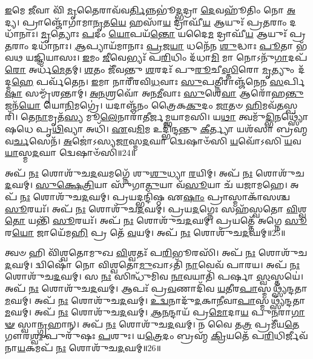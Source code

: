 \-\ul{𑌇}\-𑌮𑍇 \ul{𑌜𑍀}\-𑌵𑌾 𑌵𑌿᳴ \ul{𑌮𑍃}\-𑌤𑍈𑌰𑌾𑌵᳴𑌵\-\ul{𑌰𑍍𑌤𑌿}\-𑌨𑍍𑌨𑌭𑍂॑\-\ul{𑌦𑍍𑌭}\-𑌦𑍍𑌰𑌾 \ul{𑌦𑍇}\-𑌵𑌹𑍂᳴𑌤𑌿𑌂 𑌨𑍋 \ul{𑌅}\-𑌦𑍍𑌯। 
𑌪𑍍𑌰𑌾𑌞𑍍𑌜𑍋᳴𑌗𑌾𑌮𑌾\-\ul{𑌨𑍃}\-𑌤\-\ul{𑌯𑍇} 𑌹𑌸𑌾᳴\-\ul{𑌯} 𑌦𑍍𑌰𑌾𑌘𑍀᳴\-\ul{𑌯} 𑌆𑌯𑍁𑌃᳴ 𑌪𑍍𑌰\-\ul{𑌤}\-𑌰𑌾𑌂 𑌦𑌧𑌾᳴𑌨𑌾𑌃। 
\-\ul{𑌮𑍃}\-𑌤𑍍𑌯𑍋𑌃 \ul{𑌪}\-𑌦𑌂 \ul{𑌯𑍋}\-𑌪𑌯᳴\-\ul{𑌨𑍍𑌤𑍋} 𑌯𑌦𑍈\-\ul{𑌮} 𑌦𑍍𑌰𑌾𑌘𑍀᳴\-\ul{𑌯} 𑌆𑌯𑍁𑌃᳴ 𑌪𑍍𑌰\-\ul{𑌤}\-𑌰𑌾𑌂 𑌦𑌧𑌾᳴𑌨𑌾𑌃। 
\-\ul{𑌆}\-𑌪𑍍𑌯𑌾𑌯᳴𑌮𑌾𑌨𑌾𑌃 \ul{𑌪𑍍𑌰}\-𑌜\-\ul{𑌯𑌾} 𑌧𑌨𑍇᳴𑌨 \ul{𑌶𑍁}\-𑌦𑍍𑌧𑌾𑌃 \ul{𑌪𑍂}\-𑌤𑌾 𑌭᳴𑌵𑌥 𑌯𑌜𑍍𑌞𑌿𑌯𑌾𑌸𑌃। 
\-\ul{𑌇}\-𑌮𑌂 \ul{𑌜𑍀}\-𑌵𑍇𑌭𑍍𑌯𑌃᳴ 𑌪\-\ul{𑌰𑌿}\-𑌧𑌿𑌂 𑌦᳴𑌧𑌾\-\ul{𑌮𑌿} 𑌮𑌾 𑌨𑍋𑌽𑌨𑍁᳴\-\ul{𑌗𑌾}\-𑌦𑌪᳴\-\ul{𑌰𑍋} 𑌅𑌰𑍍𑌧᳴\-\ul{𑌮𑍇}\-𑌤𑌮𑍍। 
\-\ul{𑌶}\-𑌤𑌂 𑌜𑍀᳴𑌵𑌨𑍍𑌤𑍁 \ul{𑌶}\-𑌰𑌦𑌃᳴ 𑌪𑍁\-\ul{𑌰𑍂}\-𑌚𑍀\-\ul{𑌸𑍍𑌤𑌿}\-𑌰𑍋 \ul{𑌮𑍃}\-𑌤𑍍𑌯𑍁𑌂 𑌦᳴𑌦𑍍𑌮\-\ul{𑌹𑍇} 𑌪𑌰𑍍𑌵᳴𑌤𑍇𑌨। 
\-\ul{𑌇}\-𑌮𑌾 𑌨𑌾𑌰𑍀᳴𑌰𑌵𑌿\-\ul{𑌧}\-𑌵𑌾𑌃 \ul{𑌸𑍁}\-𑌪\-\ul{𑌤𑍍𑌨𑍀}\-𑌰𑌾𑌞𑍍𑌜᳴𑌨𑍇𑌨 \ul{𑌸}\-𑌰𑍍𑌪𑌿\-\ul{𑌷𑌾} 𑌸𑌮𑍍𑌮𑍃᳴𑌶𑌨𑍍𑌤𑌾𑌮𑍍। 
\-\ul{𑌅}\-\-\ul{𑌨}\-𑌶𑍍𑌰𑌵𑍋᳴ 𑌅𑌨\-\ul{𑌮𑍀}\-𑌵𑌾𑌃 \ul{𑌸𑍁}\-𑌶𑍇\-\ul{𑌵𑌾} 𑌆𑌰𑍋᳴𑌹\-\ul{𑌨𑍍𑌤𑍁} 𑌜𑌨᳴\-\ul{𑌯𑍋} 𑌯𑍋\-\ul{𑌨𑌿}\-𑌮𑌗𑍍𑌰𑍇॑। 
𑌯𑌦𑌾𑌞𑍍𑌜᳴𑌨𑌂 𑌤𑍍𑌰𑍈𑌕\-\ul{𑌕𑍁}\-𑌦𑌂 \ul{𑌜𑌾}\-𑌤𑍞 \ul{𑌹𑌿}\-𑌮𑌵᳴\-\ul{𑌤}\-𑌸𑍍𑌪𑌰𑌿᳴। 
𑌤𑍇\-\ul{𑌨𑌾}\-𑌮𑍃𑌤᳴\-\ul{𑌸𑍍𑌯} 𑌮𑍂\-\ul{𑌲𑍇}\-𑌨𑌾𑌰𑌾᳴𑌤𑍀𑌰𑍍𑌜𑌮𑍍𑌭𑌯𑌾𑌮𑌸𑌿। 
𑌯\-\ul{𑌥𑌾} 𑌤𑍍𑌵𑌮𑍁᳴\-\ul{𑌦𑍍𑌭𑌿}\-𑌨𑌥𑍍𑌸𑍍𑌯𑍋᳴𑌷𑌧𑍇 𑌪𑍃\-\ul{𑌥𑌿}\-𑌵𑍍𑌯𑌾 𑌅𑌧𑌿᳴। 
\-\ul{𑌏}\-𑌵\-\ul{𑌮𑌿}\-𑌮 𑌉𑌦𑍍𑌭𑌿᳴𑌨𑍍𑌦𑌨𑍍𑌤𑍁 \ul{𑌕𑍀}\-𑌰𑍍𑌤𑍍𑌯𑌾 𑌯𑌶᳴𑌸𑌾 𑌬𑍍𑌰𑌹𑍍𑌮𑌵\-\ul{𑌰𑍍𑌚}\-𑌸𑍇𑌨᳴। 
\-\ul{𑌅}\-𑌜𑍋॑𑌽𑌸𑍍𑌯\-\ul{𑌜𑌾}\-𑌸𑍍𑌮\-\ul{𑌦}\-𑌘𑌾 𑌦𑍍𑌵𑍇𑌷𑌾𑍞᳴𑌸𑌿 \ul{𑌯}\-𑌵𑍋᳴𑌽𑌸𑌿 \ul{𑌯}\-𑌵\-\ul{𑌯𑌾}\-𑌸𑍍𑌮\-\ul{𑌦}\-𑌘𑌾 𑌦𑍍𑌵𑍇𑌷𑌾𑍞᳴𑌸𑌿॥24॥
\anuvakamend[\-\ul{𑌭}\-\-\ul{𑌵} \ul{𑌜}\-\-\ul{𑌮𑍍𑌭}\-\-\ul{𑌯𑌾}\-\-\ul{𑌮}\-\-\ul{𑌸𑌿} 𑌤𑍍𑌰𑍀𑌣𑌿᳴ 𑌚]

𑌅𑌪᳴ \ul{𑌨𑌃} 𑌶𑍋𑌶𑍁᳴𑌚\-\ul{𑌦}\-𑌘𑌮𑌗𑍍𑌨𑍇᳴ 𑌶𑍁\-\ul{𑌶𑍁}\-𑌧𑍍𑌯𑌾 \ul{𑌰}\-𑌯𑌿𑌮𑍍। 
𑌅𑌪᳴ \ul{𑌨𑌃} 𑌶𑍋𑌶𑍁᳴𑌚\-\ul{𑌦}\-𑌘𑌮𑍍। 
\-\ul{𑌸𑍁}\-\-\ul{𑌕𑍍𑌷𑍇}\-\-\ul{𑌤𑍍𑌰𑌿}\-𑌯𑌾 𑌸𑍁᳴𑌗𑌾\-\ul{𑌤𑍁}\-𑌯𑌾 𑌵᳴\-\ul{𑌸𑍂}\-𑌯𑌾 𑌚᳴ 𑌯𑌜𑌾𑌮𑌹𑍇। 
𑌅𑌪᳴ \ul{𑌨𑌃} 𑌶𑍋𑌶𑍁᳴𑌚\-\ul{𑌦}\-𑌘𑌮𑍍। 
𑌪𑍍𑌰𑌯𑌦𑍍𑌭𑌨𑍍𑌦𑌿᳴𑌷𑍍𑌠 𑌏\-\ul{𑌷𑌾𑌂} 𑌪𑍍𑌰𑌾𑌸𑍍𑌮𑌾𑌕𑌾᳴𑌸𑌶𑍍𑌚 \ul{𑌸𑍂}\-𑌰𑌯𑌃᳴। 
𑌅𑌪᳴ \ul{𑌨𑌃} 𑌶𑍋𑌶𑍁᳴𑌚\-\ul{𑌦}\-𑌘𑌮𑍍। 
𑌪𑍍𑌰𑌯\-\ul{𑌦}\-𑌗𑍍𑌨𑍇𑌃 𑌸𑌹᳴𑌸𑍍𑌵𑌤𑍋 \ul{𑌵𑌿}\-𑌶𑍍𑌵\-\ul{𑌤𑍋} 𑌯𑌨𑍍𑌤𑌿᳴ \ul{𑌸𑍂}\-𑌰𑌯𑌃᳴। 
𑌅𑌪᳴ \ul{𑌨𑌃} 𑌶𑍋𑌶𑍁᳴𑌚\-\ul{𑌦}\-𑌘𑌮𑍍। 
𑌪𑍍𑌰𑌯𑌤𑍍𑌤𑍇᳴ 𑌅𑌗𑍍𑌨𑍇 \ul{𑌸𑍂}\-𑌰\-\ul{𑌯𑍋} 𑌜𑌾𑌯𑍇᳴𑌮\-\ul{𑌹𑌿} 𑌪𑍍𑌰 𑌤𑍇᳴ \ul{𑌵}\-𑌯𑌮𑍍। 
𑌅𑌪᳴ \ul{𑌨𑌃} 𑌶𑍋𑌶𑍁᳴𑌚\-\ul{𑌦}\-𑌘𑌮𑍍॥25॥

𑌤𑍍𑌵𑍞 𑌹𑌿 𑌵𑌿᳴𑌶𑍍𑌵𑌤𑍋𑌮𑍁𑌖 \ul{𑌵𑌿}\-𑌶𑍍𑌵𑌤𑌃᳴ 𑌪\-\ul{𑌰𑌿}\-𑌭𑍂𑌰𑌸𑌿᳴। 
𑌅𑌪᳴ \ul{𑌨𑌃} 𑌶𑍋𑌶𑍁᳴𑌚\-\ul{𑌦}\-𑌘𑌮𑍍। 
𑌦𑍍𑌵𑌿𑌷𑍋᳴ 𑌨𑍋 𑌵𑌿𑌶𑍍𑌵𑌤𑍋\-\ul{𑌮𑍁}\-𑌖𑌾𑌽𑌤𑌿᳴ \ul{𑌨𑌾}\-𑌵𑍇𑌵᳴ 𑌪𑌾𑌰𑌯। 
𑌅𑌪᳴ \ul{𑌨𑌃} 𑌶𑍋𑌶𑍁᳴𑌚\-\ul{𑌦}\-𑌘𑌮𑍍। 
𑌸 \ul{𑌨𑌃} 𑌸𑌿𑌨𑍍𑌧𑍁᳴𑌮𑌿𑌵 \ul{𑌨𑌾}\-𑌵𑌯𑌾𑌤𑌿᳴ 𑌪𑌰𑍍\mbox{}𑌷𑌾 \ul{𑌸𑍍𑌵}\-𑌸𑍍𑌤𑌯𑍇॑। 
𑌅𑌪᳴ \ul{𑌨𑌃} 𑌶𑍋𑌶𑍁᳴𑌚\-\ul{𑌦}\-𑌘𑌮𑍍। 
𑌆𑌪𑌃᳴ 𑌪𑍍𑌰\-\ul{𑌵}\-𑌣𑌾𑌦𑌿᳴𑌵 \ul{𑌯}\-𑌤𑍀𑌰\-\ul{𑌪𑌾}\-𑌸𑍍𑌮𑌥𑍍𑌸𑍍𑌯᳴𑌨𑍍𑌦𑌤𑌾\-\ul{𑌮}\-𑌘𑌮𑍍। 
𑌅𑌪᳴ \ul{𑌨𑌃} 𑌶𑍋𑌶𑍁᳴𑌚\-\ul{𑌦}\-𑌘𑌮𑍍। 
\-\ul{𑌉}\-\-\ul{𑌦𑍍𑌵}\-𑌨𑌾𑌦𑍁᳴\-\ul{𑌦}\-𑌕𑌾\-\ul{𑌨𑍀}\-𑌵𑌾\-\ul{𑌪𑌾}\-𑌸𑍍𑌮𑌥𑍍𑌸𑍍𑌯᳴𑌨𑍍𑌦𑌤𑌾\-\ul{𑌮}\-𑌘𑌮𑍍। 
𑌅𑌪᳴ \ul{𑌨𑌃} 𑌶𑍋𑌶𑍁᳴𑌚\-\ul{𑌦}\-𑌘𑌮𑍍। 
\-\ul{𑌆}\-\-\ul{𑌨}\-𑌨𑍍𑌦𑌾𑌯᳴ 𑌪𑍍𑌰\-\ul{𑌮𑍋}\-𑌦𑌾\-\ul{𑌯} 𑌪𑍁\-\ul{𑌨}\-𑌰𑌾\-\ul{𑌗𑌾}\-\-\ul{𑍟} 𑌸𑍍𑌵𑌾\-\ul{𑌨𑍍𑌗𑍃}\-𑌹𑌾𑌨𑍍। 
𑌅𑌪᳴ \ul{𑌨𑌃} 𑌶𑍋𑌶𑍁᳴𑌚\-\ul{𑌦}\-𑌘𑌮𑍍। 
𑌨 𑌵𑍈 𑌤\-\ul{𑌤𑍍𑌰} 𑌪𑍍𑌰𑌮𑍀᳴𑌯\-\ul{𑌤𑍇} 𑌗𑍗𑌰\-\ul{𑌶𑍍𑌵𑌃} 𑌪𑍁𑌰𑍁᳴𑌷𑌃 \ul{𑌪}\-𑌶𑍁𑌃। 
𑌯\-\ul{𑌤𑍍𑌰𑍇}\-𑌦𑌂 𑌬𑍍𑌰𑌹𑍍𑌮᳴ \ul{𑌕𑍍𑌰𑌿}\-𑌯𑌤𑍇᳴ 𑌪\-\ul{𑌰𑌿}\-𑌧𑌿𑌰𑍍𑌜𑍀𑌵᳴𑌨𑌾\-\ul{𑌯}\-𑌕𑌮𑌪᳴ \ul{𑌨𑌃} 𑌶𑍋𑌶𑍁᳴𑌚\-\ul{𑌦}\-𑌘𑌮𑍍॥26॥
\anuvakamend[\-\ul{𑌅}\-𑌘\-\ul{𑌮}\-𑌘𑌂 \ul{𑌚}\-𑌤𑍍𑌵𑌾𑌰𑌿᳴ 𑌚]


